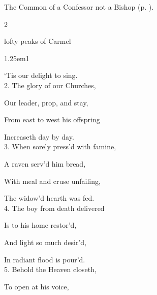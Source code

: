 
\begin{rubric}
	The Common of a Confessor not a Bishop (p. \pageref{ConfessorNotBishopCollect}).
\end{rubric}




\begin{paracol}{2}
\sloppy

\firstEvensong
{}

\firstEvensongHymn
{} lofty peaks of Carmel



\begin{hangparas}{1.25em}{1}

`Tis our delight to sing.\\

2. The glory of our Churches,

Our leader, prop, and stay,

From east to west his offspring

Increaseth day by day.\\

3. When sorely press'd with famine,

A raven serv'd him bread,

With meal and cruse unfailing,

The widow'd hearth was fed.\\

4. The boy from death delivered

Is to his home restor'd,

And light so much desir'd,

In radiant flood is pour'd.\\

5. Behold the Heaven closeth,

To open at his voice,


\end{hangparas}
\end{paracol}
